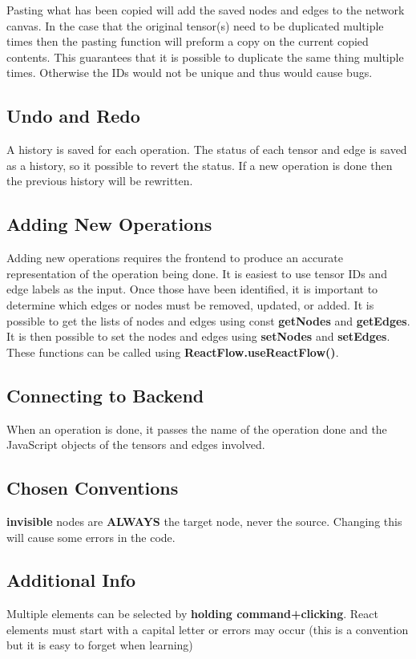 \documentclass{juliacon}
\begin{document}
\begin{appendix}
Pasting what has been copied will add the saved nodes and edges to the network canvas. In the case that the original tensor(s) need to be duplicated multiple times then the pasting function will preform a copy on the current copied contents. This guarantees that it is possible to duplicate the same thing multiple times. Otherwise the IDs would not be unique and thus would cause bugs. 


\subsection{Undo and Redo}
A history is saved for each operation. The status of each tensor and edge is saved as a history, so it possible to revert the status. If a new operation is done then the previous history will be rewritten.

\subsection{Adding New Operations}
Adding new operations requires the frontend to produce an accurate representation of the operation being done. It is easiest to use tensor IDs and edge labels as the input. Once those have been identified, it is important to determine which edges or nodes must be removed, updated, or added. It is possible to get the lists of nodes and edges using const \textbf{getNodes} and \textbf{getEdges}. It is then possible to set the nodes and edges using \textbf{setNodes} and \textbf{setEdges}. These functions can be called using \textbf{ ReactFlow.useReactFlow()}.

\subsection{Connecting to Backend}
When an operation is done, it passes the name of the operation done and the JavaScript objects of the tensors and edges involved.

\subsection{Chosen Conventions}
	\textbf{invisible} nodes are \textbf{ALWAYS} the target node, never the source. Changing this will cause some errors in the code.

\subsection{Additional Info}
Multiple elements can be selected by \textbf{holding command+clicking}. React elements must start with a capital letter or errors may occur (this is a convention but it is easy to forget when learning)



\end{appendix}
\end{document}
